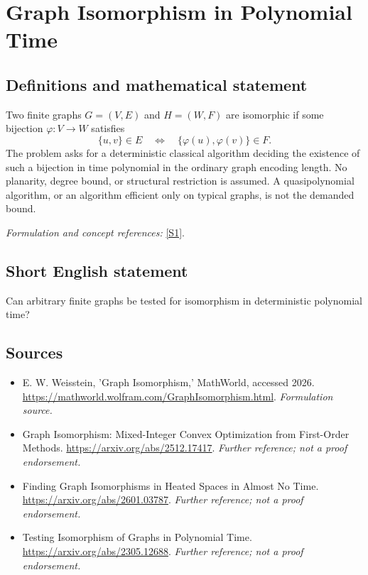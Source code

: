 \documentclass[11pt]{article}
\begin{document}
\section*{\texorpdfstring{Graph Isomorphism in Polynomial Time}{Graph Isomorphism in Polynomial Time}}\label{79}
\subsection{Definitions and mathematical statement}
Two finite graphs $G=(V,E)$ and $H=(W,F)$ are isomorphic if some bijection $\varphi:V\to W$ satisfies
\[
 \{u,v\}\in E\quad\Longleftrightarrow\quad\{\varphi(u),\varphi(v)\}\in F.
\]
The problem asks for a deterministic classical algorithm deciding the existence of such a bijection in time polynomial in the ordinary graph encoding length. No planarity, degree bound, or structural restriction is assumed. A quasipolynomial algorithm, or an algorithm efficient only on typical graphs, is not the demanded bound.
\par\smallskip\textit{Formulation and concept references:} \href{https://mathworld.wolfram.com/GraphIsomorphism.html}{[S1]}.

\subsection{Short English statement}
Can arbitrary finite graphs be tested for isomorphism in deterministic polynomial time?
\subsection{Sources}
\begin{itemize}
\item[S1]E. W. Weisstein, 'Graph Isomorphism,' MathWorld, accessed 2026.
\url{https://mathworld.wolfram.com/GraphIsomorphism.html}.
\textit{Formulation source.}
\item[S2]Graph Isomorphism: Mixed-Integer Convex Optimization from First-Order Methods.
\url{https://arxiv.org/abs/2512.17417}.
\textit{Further reference; not a proof endorsement.}
\item[S3]Finding Graph Isomorphisms in Heated Spaces in Almost No Time.
\url{https://arxiv.org/abs/2601.03787}.
\textit{Further reference; not a proof endorsement.}
\item[S4]Testing Isomorphism of Graphs in Polynomial Time.
\url{https://arxiv.org/abs/2305.12688}.
\textit{Further reference; not a proof endorsement.}
\end{itemize}
\end{document}
